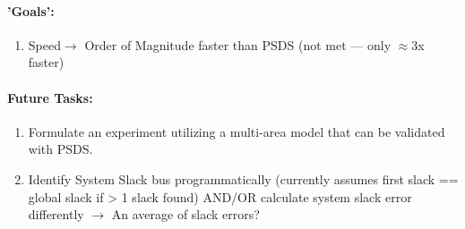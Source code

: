 \documentclass[12pt]{article}
\begin{document}
\begin{multicols}{2}
\begin{enumerate}
	\end{enumerate}

		


		
		
\paragraph{'Goals':}
	\begin{enumerate}
	\item Speed$\longrightarrow$ Order of Magnitude faster than PSDS (not met --- only $\approx$3x faster)
	\end{enumerate}

\vfill\null
\columnbreak

\paragraph{Future Tasks:} %
	\begin{enumerate}
		\item Formulate an experiment utilizing a multi-area model that can be validated with PSDS.
		\item Identify System Slack bus programmatically (currently assumes first slack == global slack if > 1 slack found)
		\subitem AND/OR calculate system slack error differently $\rightarrow$ An average of slack errors?


\end{enumerate}
\end{multicols}
\end{document}

